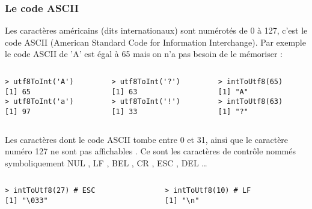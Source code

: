 \documentclass[10pt]{beamer}
\begin{document}
\begin{frame}[fragile]
  \frametitle{Le code ASCII}
  Les \alert{caractères américains (dits internationaux)} sont numérotés de 0 à 127, c'est le code ASCII (American Standard Code for Information Interchange).
  Par exemple le code ASCII de 'A' est égal à 65 mais on n'a pas besoin de le mémoriser :

\begin{columns}[t]
\begin{column}{0.33\textwidth}
  \begin{lstlisting}
> utf8ToInt('A')
[1] 65
> utf8ToInt('a')
[1] 97
  \end{lstlisting}
\end{column}
\begin{column}{0.33\textwidth}
  \begin{lstlisting}
> utf8ToInt('?')
[1] 63
> utf8ToInt('!')
[1] 33
  \end{lstlisting}
\end{column}
\begin{column}{0.33\textwidth}
  \begin{lstlisting}
> intToUtf8(65)
[1] "A"
> intToUtf8(63)
[1] "?"
  \end{lstlisting}
\end{column}
\end{columns}

Les caractères dont le code ASCII tombe entre 0 et 31, ainsi que le caractère numéro 127 ne sont pas affichables .
Ce sont les \alert{caractères de contrôle} nommés symboliquement NUL , LF , BEL , CR , ESC , DEL \dots
\begin{columns}[t]
\begin{column}{0.48\textwidth}
  \begin{lstlisting}
> intToUtf8(27) # ESC
[1] "\033"
  \end{lstlisting}
\end{column}
\begin{column}{0.48\textwidth}
  \begin{lstlisting}
> intToUtf8(10) # LF
[1] "\n"
  \end{lstlisting}

\end{column}
\end{columns}
\end{frame}
\end{document}
